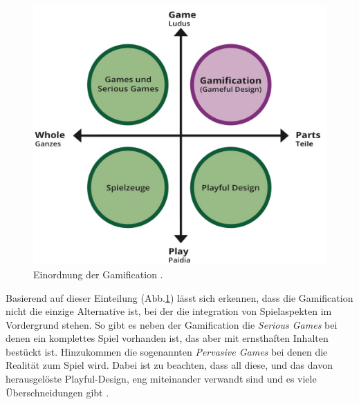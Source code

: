 \documentclass[a4paper,12pt]{scrartcl}
\begin{document}
\\\\
\begin{figure}[h!]
\begin{center}
\includegraphics[scale = 0.4]{Bilder/PlayGame.eps}
\caption{Einordnung der Gamification \cite{PlayGame2018}.}
\label{PlayGameBild}
\end{center}
\end{figure}
Basierend auf dieser Einteilung (Abb.\ref{PlayGameBild}) lässt sich erkennen, dass die Gamification nicht die einzige Alternative ist, bei der die integration von Spielaspekten im Vordergrund stehen. So gibt es neben der Gamification die \textit{Serious Games} bei denen ein komplettes Spiel vorhanden ist, das aber mit ernsthaften Inhalten bestückt ist. Hinzukommen die sogenannten \textit{Pervasive Games} bei denen die Realität zum Spiel wird. Dabei ist zu beachten, dass all diese, und das davon herausgelöste Playful-Design, eng miteinander verwandt sind und es viele Überschneidungen gibt \cite{Deterding2011}.
\end{document}
